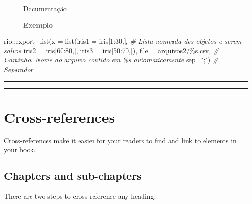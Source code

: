 \documentclass[
]{book}
\newenvironment{Shaded}{\begin{snugshade}}{\end{snugshade}}
\newcommand{\AttributeTok}[1]{\textcolor[rgb]{0.77,0.63,0.00}{#1}}
\newcommand{\CommentTok}[1]{\textcolor[rgb]{0.56,0.35,0.01}{\textit{#1}}}
\newcommand{\DecValTok}[1]{\textcolor[rgb]{0.00,0.00,0.81}{#1}}
\newcommand{\FunctionTok}[1]{\textcolor[rgb]{0.00,0.00,0.00}{#1}}
\newcommand{\NormalTok}[1]{#1}
\newcommand{\SpecialCharTok}[1]{\textcolor[rgb]{0.00,0.00,0.00}{#1}}
\newcommand{\StringTok}[1]{\textcolor[rgb]{0.31,0.60,0.02}{#1}}
\theoremstyle{definition}
\theoremstyle{definition}
\theoremstyle{definition}
\theoremstyle{definition}
\theoremstyle{remark}
\begin{document}
\begin{quote}
\href{https://www.rdocumentation.org/packages/rio/versions/0.5.26/topics/export_list}{Documentação}
\end{quote}

\begin{quote}
\textbf{Exemplo}
\end{quote}

\begin{Shaded}
\begin{Highlighting}[]
\NormalTok{rio}\SpecialCharTok{::}\FunctionTok{export\_list}\NormalTok{(}\AttributeTok{x =} \FunctionTok{list}\NormalTok{(}\AttributeTok{iris1 =}\NormalTok{ iris[}\DecValTok{1}\SpecialCharTok{:}\DecValTok{30}\NormalTok{,],   }\CommentTok{\# Lista nomeada dos objetos a serem salvos}
                          \AttributeTok{iris2 =}\NormalTok{ iris[}\DecValTok{60}\SpecialCharTok{:}\DecValTok{80}\NormalTok{,],}
                          \AttributeTok{iris3 =}\NormalTok{ iris[}\DecValTok{50}\SpecialCharTok{:}\DecValTok{70}\NormalTok{,]),}
                 \AttributeTok{file =} \StringTok{\textquotesingle{}arquivos2/\%s.csv\textquotesingle{}}\NormalTok{,      }\CommentTok{\# Caminho. Nome do arquivo contido em \%s automaticamente}
                 \AttributeTok{sep=}\StringTok{";"}\NormalTok{)     }\CommentTok{\# Separador}
\end{Highlighting}
\end{Shaded}

\begin{center}\rule{0.5\linewidth}{0.5pt}\end{center}

\begin{center}\rule{0.5\linewidth}{0.5pt}\end{center}

\hypertarget{cross}{%
\chapter{Cross-references}\label{cross}}

Cross-references make it easier for your readers to find and link to elements in your book.

\hypertarget{chapters-and-sub-chapters}{%
\section{Chapters and sub-chapters}\label{chapters-and-sub-chapters}}

There are two steps to cross-reference any heading:
\end{document}
